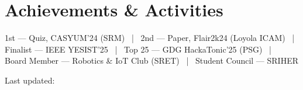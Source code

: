 \documentclass[10pt, letterpaper]{article}
\newcommand{\versionstr}{}
\begin{document}
\section{Achievements \& Activities}
\small
1st — Quiz, CASYUM'24 (SRM) \, | \,
2nd — Paper, Flair2k24 (Loyola ICAM) \, | \,
Finalist — IEEE YESIST'25 \, | \,
Top 25 — GDG HackaTonic'25 (PSG) \, | \,
Board Member — Robotics \& IoT Club (SRET) \, | \,
Student Council — SRIHER

\vspace{6pt}
\hfill {\footnotesize Last updated: \versionstr}
\end{document}
